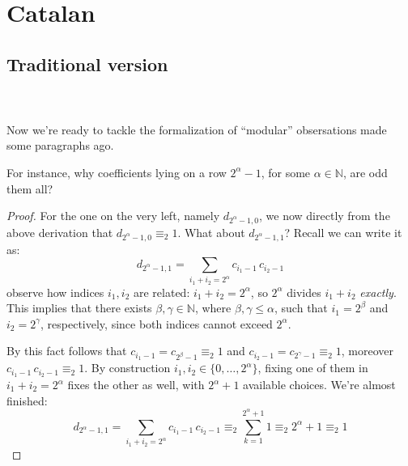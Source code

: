 \documentclass[11pt,a4paper]{article} %
\begin{document}
    \section{Catalan}

    \subsection{Traditional version}


    \\\\
    Now we're ready to tackle the formalization of ``modular'' obsersations
    made some paragraphs ago.

    For instance, why coefficients lying on a row $2^{\alpha}-1$, for
    some $\alpha\in\mathbb{N}$, are odd them all?
    \begin{proof}
        For the one on the very left, namely $d_{2^{\alpha}-1,0}$, we now
        directly from the above derivation that $d_{2^{\alpha}-1,0}\equiv_{2}1$. What about $d_{2^{\alpha}-1,1}$?
        Recall we can write it as:
        \begin{displaymath}
            d_{2^{\alpha}-1,1} = \sum_{i_{1}+ i_{2}=2^{\alpha}}{ c_{i_{1}-1}\,c_{i_{2}-1} }
        \end{displaymath}
        observe how indices $i_{1}, i_{2}$ are related: $i_{1}+ i_{2}=2^{\alpha}$,
        so $2^{\alpha}$ divides $i_{1}+i_{2}$ \emph{exactly}.
        This implies that there exists $\beta,\gamma\in\mathbb{N}$, where $\beta,\gamma\leq\alpha$,
        such that $i_{1}=2^{\beta}$ and $i_{2}=2^{\gamma}$, respectively, since both indices
        cannot exceed $2^{\alpha}$.

        By this fact follows that $c_{i_{1}-1}=c_{2^{\beta}-1}\equiv_{2}1$ and 
        $c_{i_{2}-1}=c_{2^{\gamma}-1}\equiv_{2}1$, moreover $c_{i_{1}-1}\,c_{i_{2}-1}\equiv_{2}1$.
        By construction $i_{1},i_{2}\in\lbrace0,\ldots,2^{\alpha}\rbrace$, fixing one of them in 
        $i_{1}+ i_{2}=2^{\alpha}$ fixes the other as well, with $2^{\alpha}+1$ available choices.
        We're almost finished:
        \begin{displaymath}
            d_{2^{\alpha}-1,1} = \sum_{i_{1}+ i_{2}=2^{\alpha}}{ c_{i_{1}-1}\,c_{i_{2}-1} }
                \equiv_{2} \sum_{k=1}^{2^{\alpha}+1}{1}\equiv_{2} 2^{\alpha}+1\equiv_{2} 1
        \end{displaymath}


\end{proof}
\end{document}
